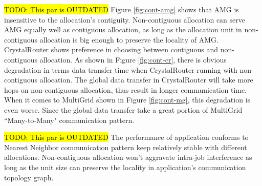 \documentclass[conference]{IEEEtran}
\newcommand{\TODO}[1]{\hl{TODO: #1}}
\begin{document}
\TODO{This par is OUTDATED} Figure \ref{fig:cont-amg} shows that AMG is insensitive to the allocation's contiguity. Non-contiguous allocation can serve AMG equally well as contiguous allocation, as long as the allocation unit in non-contiguous allocation is big enough to preserve the locality of AMG. CrystalRouter shows preference in choosing between contiguous and non-contiguous allocation. As shown in Figure \ref{fig:cont-cr}, there is obvious degradation in terms data transfer time when CrystalRouter running with non-contiguous allocation. The global data transfer in CrystalRouter will take more hops on non-contiguous allocation, thus result in longer communication time. When it comes to MultiGrid shown in Figure \ref{fig:cont-mg}, this degradation is even worse. Since the global data transfer take a great portion of MultiGrid ``Many-to-Many" communication pattern. 


\TODO{This par is OUTDATED} The performance of application conforms to Nearest Neighbor communication pattern keep relatively stable with different allocations. Non-contiguous allocation won't aggravate intra-job interference as long as the unit size can preserve the locality in application's communication topology graph. 
\end{document}
